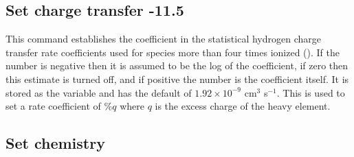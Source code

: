 \subsection{Set charge transfer -11.5}

This command establishes the coefficient in the statistical hydrogen
charge transfer rate coefficients used for species more than four times
ionized (\citealp{Ferland1997}).
If the number is negative then it is assumed
to be the log of the coefficient,
if zero then this estimate is turned off,
and if positive the number is the coefficient itself.
It is stored as the
variable  and has the default of
$1.92\times 10^{-9}$ cm$^3$ s$^{-1}$.
This is used to
set a rate coefficient of  \%$q$
where $q$ is the excess charge of the heavy element.

\subsection{Set chemistry}

